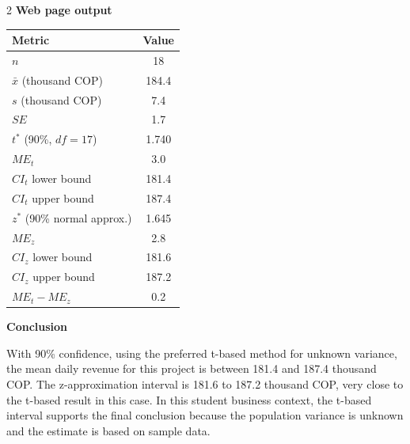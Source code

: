 \documentclass[12pt]{article}
\begin{document}
\begin{multicols}{2}
		\textbf{Web page output}\par
		\begin{center}
			\begin{tabular}{l c}
				\hline
				Metric & Value \\
				\hline
				$n$ & 18 \\
				$\bar{x}$ (thousand COP) & 184.4 \\
				$s$ (thousand COP) & 7.4 \\
				$SE$ & 1.7 \\
				$t^*$ (90\%, $df=17$) & 1.740 \\
				$ME_t$ & 3.0 \\
				$CI_t$ lower bound & 181.4 \\
				$CI_t$ upper bound & 187.4 \\
				$z^*$ (90\% normal approx.) & 1.645 \\
				$ME_z$ & 2.8 \\
				$CI_z$ lower bound & 181.6 \\
				$CI_z$ upper bound & 187.2 \\
				$ME_t-ME_z$ & 0.2 \\
				\hline
			\end{tabular}
		\end{center}
		
		\textbf{Conclusion}\par
		With 90\% confidence, using the preferred t-based method for unknown variance, the mean daily revenue for this project is between 181.4 and 187.4 thousand COP. The z-approximation interval is 181.6 to 187.2 thousand COP, very close to the t-based result in this case. In this student business context, the t-based interval supports the final conclusion because the population variance is unknown and the estimate is based on sample data.
		
		
		
	\end{multicols}
\end{document}
